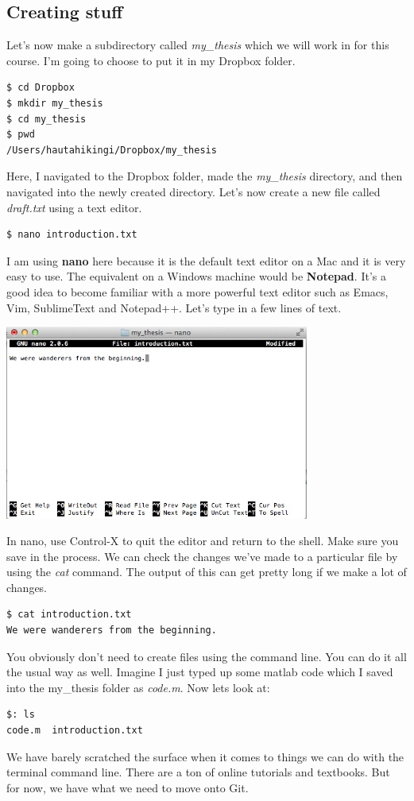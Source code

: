 \documentclass{article}
\begin{document}
\subsection{Creating stuff}
Let's now make a subdirectory called \emph{my\_thesis} which we will work in for this course. I'm going to choose to put it in my Dropbox folder.
\begin{lstlisting}
$ cd Dropbox
$ mkdir my_thesis
$ cd my_thesis
$ pwd
/Users/hautahikingi/Dropbox/my_thesis
\end{lstlisting}
Here, I navigated to the Dropbox folder, made the \emph{my\_thesis} directory, and then navigated into the newly created directory. Let's now create a new file called \emph{draft.txt} using a text editor.
\begin{lstlisting}
$ nano introduction.txt
\end{lstlisting}
I am using \textbf{nano} here because it is the default text editor on a Mac and it is very easy to use. The equivalent on a Windows machine would be \textbf{Notepad}. It's a good idea to become familiar with a more powerful text editor such as Emacs, Vim, SublimeText and Notepad++. Let's type in a few lines of text.
\begin{center}
\includegraphics[width=10cm]{./auxfiles/nano.jpg}
\end{center}
In nano, use Control-X to quit the editor and return to the shell. Make sure you save in the process. We can check the changes we've made to a particular file by using the \emph{cat} command. The output of this can get pretty long if we make a lot of changes.
\begin{lstlisting}
$ cat introduction.txt
We were wanderers from the beginning.
\end{lstlisting}
You obviously don't need to create files using the command line. You can do it all the usual way as well. Imagine I just typed up some matlab code which I saved into the my\_thesis folder as \emph{code.m}. Now lets look at:
\begin{lstlisting}
$: ls
code.m	introduction.txt
\end{lstlisting}
We have barely scratched the surface when it comes to things we can do with the terminal command line. There are a ton of online tutorials and textbooks. But for now, we have what we need to move onto Git.
\end{document}

